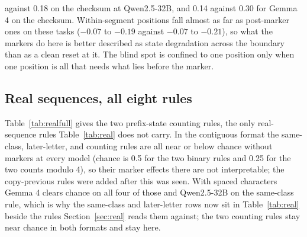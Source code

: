 \documentclass[10pt]{article} %
\newcommand{\task}[1]{\texttt{#1}}
\begin{document}
against 0.18 on the checksum at Qwen2.5-32B, and 0.14 against 0.30 for Gemma 4 on the checksum. Within-segment positions fall almost as far as post-marker ones on these tasks ($-0.07$ to $-0.19$ against $-0.07$ to $-0.21$), so what the markers do here is better described as state degradation across the boundary than as a clean reset at it. The blind spot is confined to one position only when one position is all that needs what lies before the marker.

\begin{table}[!htbp]
\centering
\small
\caption{Naturalistic prefix-state tasks. No-marker accuracy, the pooled length-matched marker effect, the change at post-marker and within-segment positions against the no-marker run at the same positions ($k \in \{2, 4, 8, 16\}$, index scoring), and, over the marked generations with $k \ge 2$, the share of post-marker and within-segment characters that match the true answer and the share that match the answer of a state restarted at every marker. Positions where the two answers coincide count for both; they are 53\% of post-marker positions on \task{bracket\_depth} and 9\% on \task{running\_checksum}, and the text gives the match rates with them excluded.}
\label{tab:naturalistic}
\resizebox{\linewidth}{!}{}
\end{table}

\subsection{Real sequences, all eight rules}
\label{app:real}

Table~\ref{tab:realfull} gives the two prefix-state counting rules, the only real-sequence rules Table~\ref{tab:real} does not carry. In the contiguous format the same-class, later-letter, and counting rules are all near or below chance without markers at every model (chance is 0.5 for the two binary rules and 0.25 for the two counts modulo 4), so their marker effects there are not interpretable; the copy-previous rules were added after this was seen. With spaced characters Gemma 4 clears chance on all four of those and Qwen2.5-32B on the same-class rule, which is why the same-class and later-letter rows now sit in Table~\ref{tab:real} beside the rules Section~\ref{sec:real} reads them against; the two counting rules stay near chance in both formats and stay here.

\begin{table}[!htbp]
\centering
\small
\caption{The two prefix-state counting rules, which stay near chance in both formats; columns as in Table~\ref{tab:real}. No cell here reaches a post-marker change of 0.25 in size, so nothing is bold.}
\label{tab:realfull}
\resizebox{\linewidth}{!}{}
\end{table}
\end{document}
